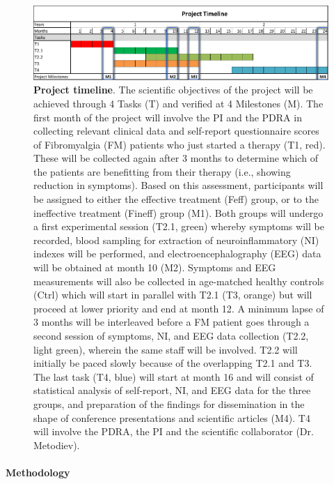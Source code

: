 \documentclass[twocolumn, serif, rga, numeric]{jote-article}
\begin{document}
\begin{figure}

 \includegraphics[width=\linewidth]{articles/RGAs/Valentini/media/fig1.pdf}
\caption{\textbf{Project timeline}. The scientific objectives of the project will be achieved through 4 Tasks (T) and verified at 4 Milestones (M). The first month of the project will involve the PI and the PDRA in collecting relevant clinical data and self-report questionnaire scores of Fibromyalgia (FM) patients who just started a therapy (T1, red). These will be collected again after 3 months to determine which of the patients are benefitting from their therapy (i.e., showing reduction in symptoms). Based on this assessment, participants will be assigned to either the effective treatment (Feff) group, or to the ineffective treatment (Fineff) group (M1). Both groups will undergo a first experimental session (T2.1, green) whereby symptoms will be recorded, blood sampling for extraction of neuroinflammatory (NI) indexes will be performed, and electroencephalography (EEG) data will be obtained at month 10 (M2). Symptoms and EEG measurements will also be collected in age-matched healthy controls (Ctrl) which will start in parallel with T2.1 (T3, orange) but will proceed at lower priority and end at month 12. A minimum lapse of 3 months will be interleaved before a FM patient goes through a second session of symptoms, NI, and EEG data collection (T2.2, light green), wherein the same staff will be involved. T2.2 will initially be paced slowly because of the overlapping T2.1 and T3. The last task (T4, blue) will start at month 16 and will consist of statistical analysis of self-report, NI, and EEG data for the three groups, and preparation of the findings for dissemination in the shape of conference presentations and scientific articles (M4). T4 will involve the PDRA, the PI and the scientific collaborator (Dr. Metodiev).}
\end{figure}

\noindent\paragraph{\noindent Methodology}
\end{document}
